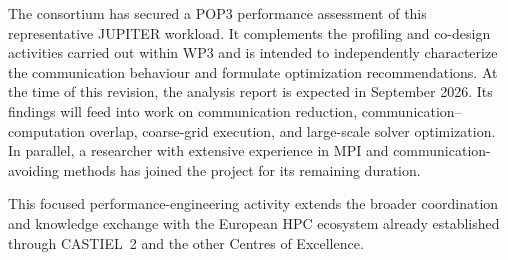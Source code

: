 \documentclass[a4paper,12pt]{article}
\begin{document}
The consortium has secured a POP3 performance assessment of this
representative JUPITER workload. It complements the profiling and co-design
activities carried out within WP3 and is intended to independently
characterize the communication behaviour and formulate optimization
recommendations. At the time of this revision, the analysis report is
expected in September 2026. Its findings will feed into work on communication
reduction, communication--computation overlap, coarse-grid execution, and
large-scale solver optimization. In parallel, a researcher with extensive
experience in MPI and communication-avoiding methods has joined the project
for its remaining duration.

This focused performance-engineering activity extends the broader
coordination and knowledge exchange with the European HPC ecosystem already
established through CASTIEL~2 and the other Centres of Excellence.

\label{MyLastPage}
\end{document}
